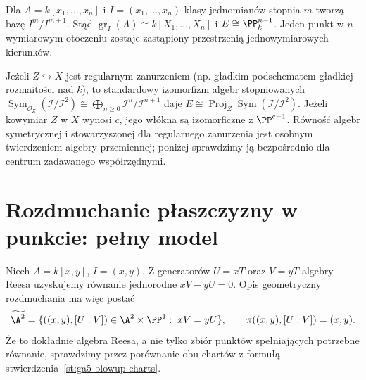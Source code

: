 \begin{przyklad}[Punkt w $\A^n$]
Dla $A=k[x_1,\ldots,x_n]$ i
$I=(x_1,\ldots,x_n)$ klasy jednomianów stopnia $m$
tworzą bazę $I^m/I^{m+1}$. Stąd
$\operatorname{gr}_I(A)\cong k[X_1,\ldots,X_n]$
i $E\cong\PP^{n-1}_k$.
Jeden punkt w $n$-wymiarowym otoczeniu zostaje
zastąpiony przestrzenią jednowymiarowych kierunków.
\end{przyklad}

\begin{uwaga}
Jeżeli $Z\hookrightarrow X$ jest regularnym zanurzeniem
(np. gładkim podschematem gładkiej rozmaitości nad $k$),
to standardowy izomorfizm algebr stopniowanych
$\operatorname{Sym}_{\mathcal O_Z}(\mathcal I/\mathcal I^2)
\cong\bigoplus_{n\ge0}\mathcal I^n/\mathcal I^{n+1}$
daje
$E\cong\operatorname{Proj}_Z
\operatorname{Sym}(\mathcal I/\mathcal I^2)$.
Jeżeli kowymiar $Z$ w $X$ wynosi $c$, jego włókna są
izomorficzne z $\PP^{c-1}$. Równość algebr
symetrycznej i stowarzyszonej dla regularnego zanurzenia
jest osobnym twierdzeniem algebry przemiennej;
poniżej sprawdzimy ją bezpośrednio dla centrum
zadawanego współrzędnymi.
\end{uwaga}

\section{Rozdmuchanie płaszczyzny w punkcie: pełny model}
\label{sec:ga5-plane}

Niech $A=k[x,y]$, $I=(x,y)$. Z generatorów
$U=xT$ oraz $V=yT$ algebry Reesa uzyskujemy
równanie jednorodne $xV-yU=0$. Opis geometryczny
rozdmuchania ma więc postać
\[
 \widetilde{\A^2}
 =\{((x,y),[U:V])\in\A^2\times\PP^1:\;xV=yU\},
 \qquad \pi((x,y),[U:V])=(x,y).
\]
Że to dokładnie algebra Reesa, a nie tylko zbiór
punktów spełniających potrzebne równanie, sprawdzimy
przez porównanie obu chartów z formułą
stwierdzenia~\ref{st:ga5-blowup-charts}.

